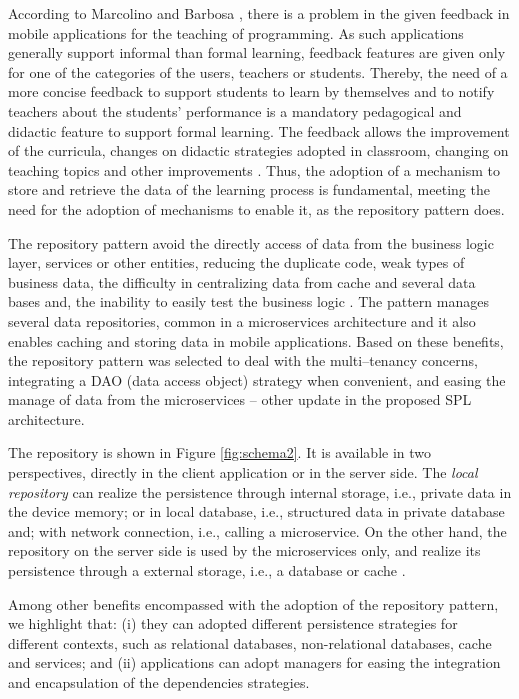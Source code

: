 According to Marcolino and Barbosa \cite{marcolinoarcht2017}, there is a problem in the given feedback in mobile applications for the teaching of programming. As such applications generally support informal than formal learning, feedback features are given only for one of the categories of the users, teachers or students. Thereby, the need of a more concise feedback to support students to learn by themselves and to notify teachers about the students' performance is a mandatory pedagogical and didactic feature to support formal learning. The feedback allows the improvement of the curricula, changes on didactic strategies adopted in classroom, changing on teaching topics and other improvements \cite{marcolino_catalog2016}. Thus, the adoption of a mechanism to store and retrieve the data of the learning process is fundamental, meeting the need for the adoption of mechanisms to enable it, as the repository pattern does.

The repository pattern avoid the directly access of data from the business logic layer, services or other entities, reducing the duplicate code, weak types of business data, the difficulty in centralizing data from cache and several data bases and, the inability to easily test the business logic \cite{repository}. The pattern manages several data repositories, common in a microservices architecture and it also enables caching and storing data in mobile applications. Based on these benefits, the repository pattern was selected to deal with the multi--tenancy concerns, integrating a DAO (data access object) strategy when convenient, and easing the manage of data from the microservices -- other update in the proposed SPL architecture.

The repository is shown in Figure \ref{fig:schema2}. It is available in two perspectives, directly in the client application or in the server side. The \textit{local repository} can realize the persistence through internal storage, i.e., private data in the device memory; or in local database, i.e., structured data in private database and; with network connection, i.e., calling a microservice. On the other hand, the repository on the server side is used by the microservices only, and realize its persistence through a external storage, i.e., a database or cache \cite{repository}.

Among other benefits encompassed with the adoption of the repository pattern, we highlight that: (i) they can adopted different persistence strategies for different contexts, such as relational databases, non-relational databases, cache and services; and (ii) applications can adopt managers for easing the integration and encapsulation of the dependencies strategies.


